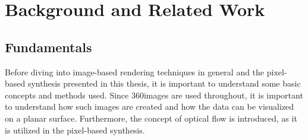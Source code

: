 \chapter{Background and Related Work}

%

\section{Fundamentals}
Before diving into image-based rendering techniques in general and the pixel-based synthesis presented in this thesis, it is important to understand some basic concepts and methods used. Since 360\degree images are used throughout, it is important to understand how such images are created and how the data can be visualized on a planar surface. Furthermore, the concept of optical flow is introduced, as it is utilized in the pixel-based synthesis.

